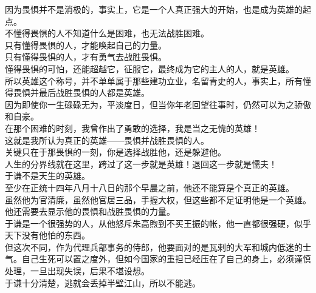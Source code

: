 \begin{multicols}{\theparacolNo}
因为畏惧并不是消极的，事实上，它是一个人真正强大的开始，也是成为英雄的起点。\\

不懂得畏惧的人不知道什么是困难，也无法战胜困难。\\

只有懂得畏惧的人，才能唤起自己的力量。\\

只有懂得畏惧的人，才有勇气去战胜畏惧。\\

懂得畏惧的可怕，还能超越它，征服它，最终成为它的主人的人，就是英雄。\\

所以英雄这个称号，并不单单属于那些建功立业，名留青史的人，事实上，所有懂得畏惧并最后战胜畏惧的人都是英雄。\\

因为即使你一生碌碌无为，平淡度日，但当你年老回望往事时，仍然可以为之骄傲和自豪。\\

在那个困难的时刻，我曾作出了勇敢的选择，我是当之无愧的英雄！\\

这就是我所认为真正的英雄——畏惧并战胜畏惧的人。\\

关键只在于那畏惧的一刻，你是选择战胜他，还是躲避他。\\

人生的分界线就在这里，跨过了这一步就是英雄！退回这一步就是懦夫！\\

于谦不是天生的英雄。\\

至少在正统十四年八月十八日的那个早晨之前，他还不能算是个真正的英雄。\\

虽然他为官清廉，虽然他官居三品，手握大权，但这些都不足证明他是一个英雄。\\

他还需要去显示他的畏惧和战胜畏惧的力量。\\

于谦是一个很强势的人，从他怒斥朱高煦到不买王振的帐，他一直都很强硬，似乎天下没有他怕的东西。\\

但这次不同，作为代理兵部事务的侍郎，他要面对的是瓦剌的大军和城内低迷的士气。自己生死可以置之度外，但如今国家的重担已经压在了自己的身上，必须谨慎处理，一旦出现失误，后果不堪设想。\\

于谦十分清楚，逃就会丢掉半壁江山，所以不能逃。\\


\end{multicols}
